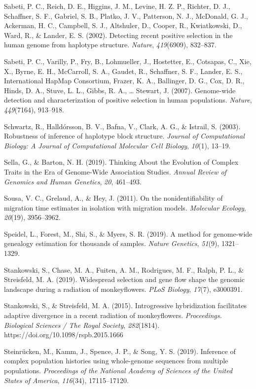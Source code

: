 \documentclass[twocolumn]{bmcart}%
\begin{document}
\begin{backmatter}
Sabeti, P. C., Reich, D. E., Higgins, J. M., Levine, H. Z. P., Richter,
D. J., Schaffner, S. F., Gabriel, S. B., Platko, J. V., Patterson, N.
J., McDonald, G. J., Ackerman, H. C., Campbell, S. J., Altshuler, D.,
Cooper, R., Kwiatkowski, D., Ward, R., \& Lander, E. S. (2002).
Detecting recent positive selection in the human genome from haplotype
structure. \emph{Nature}, \emph{419}(6909), 832--837.

Sabeti, P. C., Varilly, P., Fry, B., Lohmueller, J., Hostetter, E.,
Cotsapas, C., Xie, X., Byrne, E. H., McCarroll, S. A., Gaudet, R.,
Schaffner, S. F., Lander, E. S., International HapMap Consortium,
Frazer, K. A., Ballinger, D. G., Cox, D. R., Hinds, D. A., Stuve, L. L.,
Gibbs, R. A., \ldots{} Stewart, J. (2007). Genome-wide detection and
characterization of positive selection in human populations.
\emph{Nature}, \emph{449}(7164), 913--918.

Schwartz, R., Halldórsson, B. V., Bafna, V., Clark, A. G., \& Istrail,
S. (2003). Robustness of inference of haplotype block structure.
\emph{Journal of Computational Biology: A Journal of Computational
Molecular Cell Biology}, \emph{10}(1), 13--19.

Sella, G., \& Barton, N. H. (2019). Thinking About the Evolution of
Complex Traits in the Era of Genome-Wide Association Studies.
\emph{Annual Review of Genomics and Human Genetics}, \emph{20},
461--493.

Sousa, V. C., Grelaud, A., \& Hey, J. (2011). On the nonidentifiability
of migration time estimates in isolation with migration models.
\emph{Molecular Ecology}, \emph{20}(19), 3956--3962.

Speidel, L., Forest, M., Shi, S., \& Myers, S. R. (2019). A method for
genome-wide genealogy estimation for thousands of samples. \emph{Nature
Genetics}, \emph{51}(9), 1321--1329.

Stankowski, S., Chase, M. A., Fuiten, A. M., Rodrigues, M. F., Ralph, P.
L., \& Streisfeld, M. A. (2019). Widespread selection and gene flow
shape the genomic landscape during a radiation of monkeyflowers.
\emph{PLoS Biology}, \emph{17}(7), e3000391.

Stankowski, S., \& Streisfeld, M. A. (2015). Introgressive hybridization
facilitates adaptive divergence in a recent radiation of monkeyflowers.
\emph{Proceedings. Biological Sciences / The Royal Society},
\emph{282}(1814). https://doi.org/10.1098/rspb.2015.1666

Steinrücken, M., Kamm, J., Spence, J. P., \& Song, Y. S. (2019).
Inference of complex population histories using whole-genome sequences
from multiple populations. \emph{Proceedings of the National Academy of
Sciences of the United States of America}, \emph{116}(34), 17115--17120.


\end{backmatter}
\end{document}
